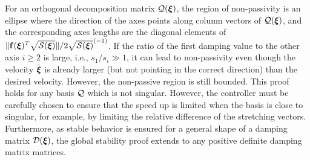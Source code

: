 For an orthogonal decomposition matrix $\mathcal{Q}(\boldsymbol{{\boldsymbol{\xi}}})$, the region of non-passivity is an ellipse where the direction of the axes points along column vectors of $\mathcal{Q}({\boldsymbol{\xi}})$, and the corresponding axes lengths are the diagonal elements of $\| \mathbf{f}({\boldsymbol{\xi}})^T \sqrt{\mathcal{S}({\boldsymbol{\xi}})}\| / 2 \sqrt{\mathcal{S}({\boldsymbol{\xi}})}^{(-1)}$. 
If the ratio of the first damping value to the other axis $i \geq 2$ is large, i.e., $s_1 / s_i \gg 1$, it can lead to non-passivity even though the velocity $\dot{\boldsymbol{\xi}}$ is already larger (but not pointing in the correct direction) than the desired velocity. However, the non-passive region is still bounded.
This proof holds for any basis $\mathcal{Q}$ which is not singular. However, the controller must be carefully chosen to ensure that the speed up is limited when the basis is close to singular, for example, by limiting the relative difference of the stretching vectors. Furthermore, as stable behavior is ensured for a general shape of a damping matrix $\mathcal{D}(\boldsymbol{\xi})$, the global stability proof extends to any positive definite damping matrix matrices.

